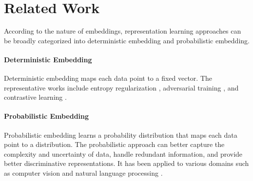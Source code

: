 \documentclass[letterpaper]{article} %
\begin{document}
\section{Related Work} 
According to the nature of embeddings, representation learning approaches can be broadly categorized into deterministic embedding and probabilistic embedding.

\paragraph{Deterministic Embedding}
Deterministic embedding maps each data point to a fixed vector. The representative works include entropy regularization \citep{DBLP:conf/iclr/PereyraTCKH17}, adversarial training \citep{DBLP:conf/iclr/MiyatoDG17}, and contrastive learning \citep{gunel2020supervised,DBLP:conf/acl/0001BWZH23}.

\paragraph{Probabilistic Embedding}
Probabilistic embedding \cite{DBLP:journals/corr/VilnisM14} learns a probability distribution that maps each data point to a distribution. The probabilistic approach can better capture the complexity and uncertainty of data, handle redundant information, and provide better discriminative representations. It has been applied to various domains such as computer vision \cite{DBLP:conf/iclr/OhMPRSG19,DBLP:conf/iccv/ShiJ19,chang2020data,DBLP:conf/iclr/RameC21} and natural language processing \cite{DBLP:conf/iclr/MahabadiBH21,DBLP:conf/iclr/WangWCGJLL21,DBLP:conf/emnlp/0001HDZJMS22}.
\end{document}
